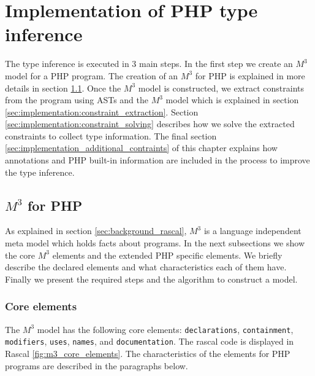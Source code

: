 \documentclass[../main.tex]{subfiles}
\begin{document}
    \chapter{Implementation of PHP type inference}\label{ch:inference_implementation}

    The type inference is executed in 3 main steps.
    In the first step we create an $M^3$ model for a PHP program.
    The creation of an $M^3$ for PHP is explained in more details in section \ref{sec:m3_for_php}.
    Once the $M^3$ model is constructed, we extract constraints from the program using ASTs and the $M^3$ model which is explained in section \ref{sec:implementation:constraint_extraction}.
    Section \ref{sec:implementation:constraint_solving} describes how we solve the extracted constraints to collect type information.
    The final section \ref{sec:implementation_additional_contraints} of this chapter explains how annotations and PHP built-in information are included in the process to improve the type inference.
    
    \section{$M^3$ for PHP}\label{sec:m3_for_php}
    As explained in section \ref{sec:background_rascal}, $M^3$ is a language independent meta model which holds facts about programs.    
    In the next subsections we show the core $M^3$ elements and the extended PHP specific elements.
    We briefly describe the declared elements and what characteristics each of them have.
    Finally we present the required steps and the algorithm to construct a model.
    
    \subsection{Core elements}
    The $M^3$ model has the following core elements: \texttt{declarations}, \texttt{containment}, \texttt{modifiers}, \texttt{uses}, \texttt{names}, and \texttt{documentation}.
    The rascal code is displayed in Rascal \ref{fig:m3_core_elements}. The characteristics of the elements for PHP programs are described in the paragraphs below.
\end{document}
